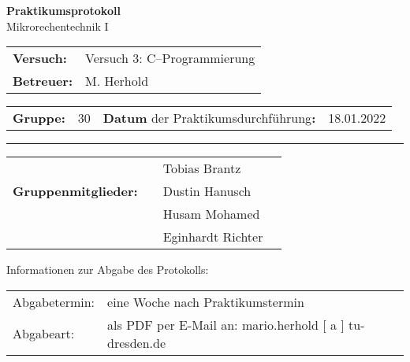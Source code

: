 \documentclass[oneside,a4paper,12pt]{article}
\def\Betreuer{M. Herhold}
\def\Gruppennummer{ 30  }
\def\DatumDerDurchführung{18.01.2022}
\def\StudentEins{Tobias Brantz}
\def\StudentZwei{Dustin Hanusch}
\def\StudentDrei{Husam Mohamed}
\def\StudentVier{Eginhardt Richter}
\begin{document}
\begin{center}
    {\Huge \textbf{Praktikumsprotokoll}\\}
    \bigskip
    {\Large Mikrorechentechnik I}\\
\end{center}

\vfill

\renewcommand{\arraystretch}{1.2}

\begin{tabularx}{\textwidth}{p{2cm} X}
    \textbf{Versuch:} & Versuch 3: C--Programmierung \\[3em]
  \textbf{Betreuer:} & \Betreuer \\ \cline{2-2}
\end{tabularx}

\begin{tabularx}{\textwidth}{p{2cm} p{0.38cm} X p{2.2cm}}
  \textbf{Gruppe:} & \Gruppennummer & \hfill \textbf{Datum} {\small der Praktikumsdurchführung}\textbf{:} & \DatumDerDurchführung \\
  \cline{2-2} \cline{4-4}
\end{tabularx}

\vfill

\renewcommand{\arraystretch}{3}
\rule{\textwidth}{0.5mm}
\begin{tabularx}{\textwidth}{p{4.2cm} | p{0.5cm} X p{0.5cm}}
  & & \StudentEins & \\ \cline{3-3}
  \textbf{Gruppenmitglieder:} & & \StudentZwei & \\  \cline{3-3}
  & & \StudentDrei & \\  \cline{3-3}
  & & \StudentVier & \\  \cline{3-3}
\end{tabularx}

\vfill
\vfill
\renewcommand{\arraystretch}{1}
Informationen zur Abgabe des Protokolls:\\[0.8em]
{\small
    \begin{tabularx}{\textwidth}{p{2.4cm} X}
        Abgabetermin:    & eine Woche nach Praktikumstermin\\[0.6em]
        Abgabeart:       & als PDF per E-Mail an: mario.herhold [ a ] tu-dresden.de\\
    \end{tabularx}}
\end{document}
